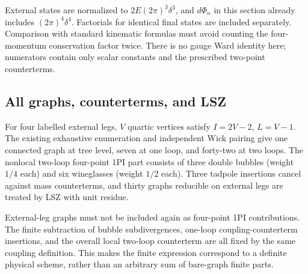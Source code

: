 \documentclass[11pt,a4paper,oneside]{article}
\theoremstyle{plain}
\theoremstyle{definition}
\theoremstyle{remark}
\numberwithin{equation}{section}
\begin{document}
External states are normalized to $2E(2\pi)^3\delta^3$, and $d\Phi_n$ in this section already includes $(2\pi)^4\delta^4$. Factorials for identical final states are included separately. Comparison with standard kinematic formulas \cite{pdg} must avoid counting the four-momentum conservation factor twice. There is no gauge Ward identity here; numerators contain only scalar constants and the prescribed two-point counterterms.


\subsection{All graphs, counterterms, and LSZ}
For four labelled external legs, $V$ quartic vertices satisfy $I=2V-2$, $L=V-1$. The existing exhaustive enumeration and independent Wick pairing give one connected graph at tree level, seven at one loop, and forty-two at two loops. The nonlocal two-loop four-point 1PI part consists of three double bubbles (weight $1/4$ each) and six wineglasses (weight $1/2$ each). Three tadpole insertions cancel against mass counterterms, and thirty graphs reducible on external legs are treated by LSZ with unit residue.

External-leg graphs must not be included again as four-point 1PI contributions. The finite subtraction of bubble subdivergences, one-loop coupling-counterterm insertions, and the overall local two-loop counterterm are all fixed by the same coupling definition. This makes the finite expression correspond to a definite physical scheme, rather than an arbitrary sum of bare-graph finite parts.
\end{document}
